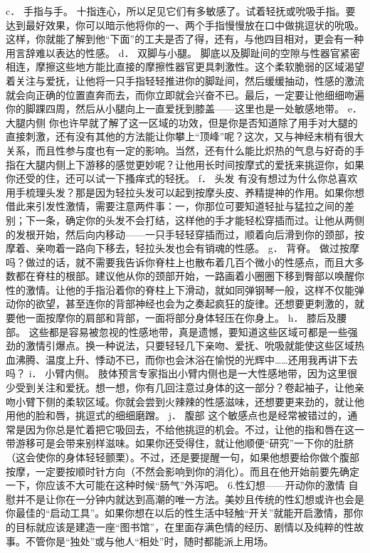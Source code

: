 \documentclass[12pt,UTF8,openany]{ctexbook}
\begin{document}
c． 手指与手。
十指连心，所以足见它们有多敏感了。试着轻抚或吮吸手指。要达到最好效果，你可以暗示他将你的一、两个手指慢慢放在口中做挑逗状的吮吸。这样，你就能了解到他“下面”的工夫是否了得，还有，与他四目相对，更会有一种用言辞难以表达的性感。
d． 双脚与小腿。
脚底以及脚趾间的空隙与性器官紧密相连，摩擦这些地方能比直接的摩擦性器官更具刺激性。这个柔软脆弱的区域渴望着关注与爱抚，让他将一只手指轻轻推进你的脚趾间，然后缓缓抽动，性感的激流就会向正确的位置直奔而去，而你立即就会兴奋不已。最后，一定要让他细细吻遍你的脚踝四周，然后从小腿向上一直爱抚到膝盖——这里也是一处敏感地带。
e． 大腿内侧
你也许早就了解了这一区域的功效，但是你是否知道除了用手对大腿的直接刺激，还有没有其他的方法能让你攀上“顶峰”呢？这次，又与神经末梢有很大关系，而且性参与度也有一定的影响。当然，还有什么能比炽热的气息与好奇的手指在大腿内侧上下游移的感觉更妙呢？让他用长时间按摩式的爱抚来挑逗你，如果你还受的住，还可以试一下搔痒式的轻抚。
f． 头发
有没有想过为什么你总喜欢用手梳理头发？那是因为轻拉头发可以起到按摩头皮、养精提神的作用。如果你想借此来引发性激情，需要注意两件事：一，你那位可要知道轻扯与猛拉之间的差别；下一条，确定你的头发不会打结，这样他的手才能轻松穿插而过。让他从两侧的发根开始，然后向内移动——一只手轻轻穿插而过，顺着向后滑到你的颈部，按摩着、亲吻着一路向下移去，轻拉头发也会有销魂的性感。
g． 背脊。
做过按摩吗？做过的话，就不需要我告诉你脊柱上也散布着几百个微小的性感点，而且大多数都在脊柱的根部。建议他从你的颈部开始，一路画着小圈圈下移到臀部以唤醒你性的激情。让他的手指沿着你的脊柱上下滑动，就如同弹钢琴一般，这样不仅能弹动你的欲望，甚至连你的背部神经也会为之奏起疯狂的旋律。还想要更刺激的，就要他一面按摩你的肩部和背部，一面将部分身体轻压在你身上。
h． 膝后及腰部。
这些都是容易被忽视的性感地带，真是遗憾，要知道这些区域可都是一些强劲的激情引爆点。换一种说法，只要轻轻几下亲吻、爱抚、吮吸就能使这些区域热血沸腾、温度上升、悸动不已，而你也会沐浴在愉悦的光辉中……还用我再讲下去吗？
i． 小臂内侧。
肢体预言专家指出小臂内侧也是一大性感地带，因为这里很少受到关注和爱抚。想一想，你有几回注意过身体的这一部分？卷起袖子，让他亲吻小臂下侧的柔软区域。你就会尝到火辣辣的性感滋味，还想要更来劲的，就让他用他的脸和唇，挑逗式的细细磨蹭。
j． 腹部
这个敏感点也是经常被错过的，通常是因为你总是忙着把它吸回去，不给他挑逗的机会。不过，让他的指和唇在这一带游移可是会带来别样滋味。如果你还受得住，就让他顺便“研究”一下你的肚脐（这会使你的身体轻轻颤栗）。不过，还是要提醒一句，如果他想要给你做个腹部按摩，一定要按顺时针方向（不然会影响到你的消化）。而且在他开始前要先确定一下，你应该不大可能在这种时候“肠气”外泻吧。
6.性幻想——开动你的激情
自慰并不是让你在一分钟内就达到高潮的唯一方法。美妙且传统的性幻想或许也会是你最佳的“启动工具”。如果你想在以后的性生活中轻触“开关”就能开启激情，那你的目标就应该是建造一座“图书馆”，在里面存满色情的经历、剧情以及纯粹的性故事。不管你是“独处”或与他人“相处”时，随时都能派上用场。
\end{document}
